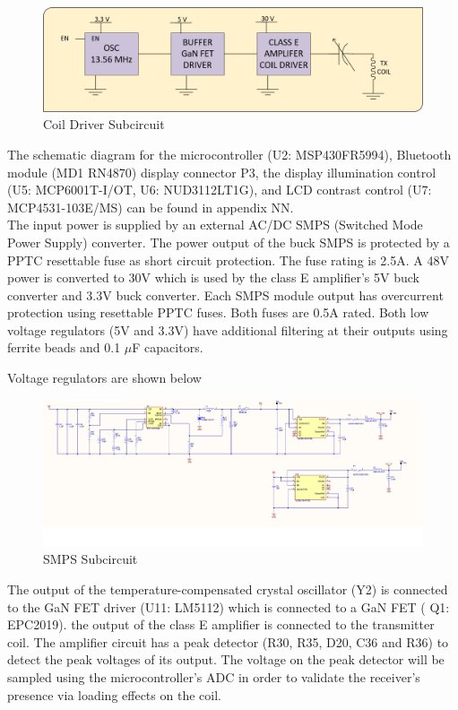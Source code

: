 \documentclass[12pt]{article}
\begin{document}
\hfill

\begin{figure}[h!]
\centering
\includegraphics[width=0.88\linewidth]{trans_coil}
\caption{Coil Driver Subcircuit}
\end{figure}

\hfill

\indent
The schematic diagram for the microcontroller (U2: MSP430FR5994), Bluetooth module (MD1 RN4870) display connector P3, the display illumination control (U5: MCP6001T-I/OT, U6: NUD3112LT1G), and LCD contrast control (U7: MCP4531-103E/MS) can be found in appendix NN.\\

\indent
The input power is supplied by an external AC/DC SMPS (Switched Mode Power Supply) converter. The power output of the buck SMPS is protected by a PPTC resettable fuse as short circuit protection. The fuse rating is 2.5A. A 48V power is converted to 30V which is used by the class E amplifier’s 5V buck converter and 3.3V buck converter. Each SMPS module output has overcurrent protection using resettable PPTC fuses. Both fuses are 0.5A rated.
Both low voltage regulators (5V and 3.3V) have additional filtering at their outputs using ferrite beads and 0.1 $\mu$F capacitors.

\pagebreak

\indent
Voltage regulators are shown below

\hfill

\begin{figure}[h!]
\centering
\includegraphics[width=0.925\linewidth]{tx_smps}
\caption{SMPS Subcircuit}
\end{figure}

\indent
The output of the temperature-compensated crystal oscillator (Y2) is connected to the GaN FET driver (U11: LM5112) which is connected to a GaN FET ( Q1: EPC2019). the output of the class E amplifier is connected to the transmitter coil. The amplifier circuit has a peak detector (R30, R35, D20, C36 and R36) to detect the peak voltages of its output. The voltage on the peak detector will be sampled using the microcontroller’s ADC in order to validate the receiver’s presence via loading effects on the coil.\\
\end{document}
